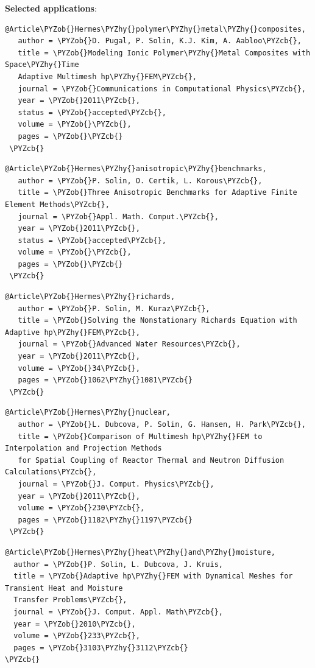\documentclass[a4paper,0pt,english]{sphinxmanual}
\def\PYZcb{}
\def\PYZob{}
\def\PYZhy{-}
\begin{document}
\textbf{Selected applications}:
\begin{Verbatim}[commandchars=\\\{\}]
 @Article\PYZob{}Hermes\PYZhy{}polymer\PYZhy{}metal\PYZhy{}composites,
   author = \PYZob{}D. Pugal, P. Solin, K.J. Kim, A. Aabloo\PYZcb{},
   title = \PYZob{}Modeling Ionic Polymer\PYZhy{}Metal Composites with Space\PYZhy{}Time
   Adaptive Multimesh hp\PYZhy{}FEM\PYZcb{},
   journal = \PYZob{}Communications in Computational Physics\PYZcb{},
   year = \PYZob{}2011\PYZcb{},
   status = \PYZob{}accepted\PYZcb{},
   volume = \PYZob{}\PYZcb{},
   pages = \PYZob{}\PYZcb{}
 \PYZcb{}
\end{Verbatim}
\begin{Verbatim}[commandchars=\\\{\}]
 @Article\PYZob{}Hermes\PYZhy{}anisotropic\PYZhy{}benchmarks,
   author = \PYZob{}P. Solin, O. Certik, L. Korous\PYZcb{},
   title = \PYZob{}Three Anisotropic Benchmarks for Adaptive Finite Element Methods\PYZcb{},
   journal = \PYZob{}Appl. Math. Comput.\PYZcb{},
   year = \PYZob{}2011\PYZcb{},
   status = \PYZob{}accepted\PYZcb{},
   volume = \PYZob{}\PYZcb{},
   pages = \PYZob{}\PYZcb{}
 \PYZcb{}
\end{Verbatim}
\begin{Verbatim}[commandchars=\\\{\}]
 @Article\PYZob{}Hermes\PYZhy{}richards,
   author = \PYZob{}P. Solin, M. Kuraz\PYZcb{},
   title = \PYZob{}Solving the Nonstationary Richards Equation with Adaptive hp\PYZhy{}FEM\PYZcb{},
   journal = \PYZob{}Advanced Water Resources\PYZcb{},
   year = \PYZob{}2011\PYZcb{},
   volume = \PYZob{}34\PYZcb{},
   pages = \PYZob{}1062\PYZhy{}1081\PYZcb{}
 \PYZcb{}
\end{Verbatim}
\begin{Verbatim}[commandchars=\\\{\}]
 @Article\PYZob{}Hermes\PYZhy{}nuclear,
   author = \PYZob{}L. Dubcova, P. Solin, G. Hansen, H. Park\PYZcb{},
   title = \PYZob{}Comparison of Multimesh hp\PYZhy{}FEM to Interpolation and Projection Methods
   for Spatial Coupling of Reactor Thermal and Neutron Diffusion Calculations\PYZcb{},
   journal = \PYZob{}J. Comput. Physics\PYZcb{},
   year = \PYZob{}2011\PYZcb{},
   volume = \PYZob{}230\PYZcb{},
   pages = \PYZob{}1182\PYZhy{}1197\PYZcb{}
 \PYZcb{}
\end{Verbatim}
\begin{Verbatim}[commandchars=\\\{\}]
@Article\PYZob{}Hermes\PYZhy{}heat\PYZhy{}and\PYZhy{}moisture,
  author = \PYZob{}P. Solin, L. Dubcova, J. Kruis,
  title = \PYZob{}Adaptive hp\PYZhy{}FEM with Dynamical Meshes for Transient Heat and Moisture
  Transfer Problems\PYZcb{},
  journal = \PYZob{}J. Comput. Appl. Math\PYZcb{},
  year = \PYZob{}2010\PYZcb{},
  volume = \PYZob{}233\PYZcb{},
  pages = \PYZob{}3103\PYZhy{}3112\PYZcb{}
\PYZcb{}
\end{Verbatim}
\end{document}
